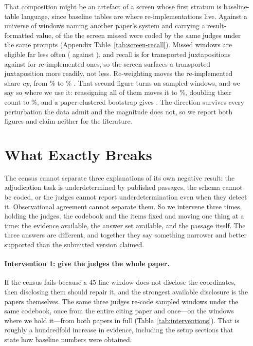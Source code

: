 \documentclass[11pt]{article}
\begin{document}
That composition might be an artefact of a screen whose first stratum is
baseline-table language, since baseline tables are where re-implementations
live. Against a universe of \RecUniverse{} windows naming another paper's system
and carrying a result-formatted value, \RecSampled{} of the \RecMissed{} the
screen missed were coded by the same judges under the same prompts (Appendix
Table~\ref{tab:screen-recall}). Missed windows are eligible far less often
(\RecEligMissed{} against \RecEligFrame{}), and recall is \RecTrans{}
\RecTransCI{} for transported juxtapositions against \RecReimpl{}
\RecReimplCI{} for re-implemented ones, so the screen surfaces a transported
juxtaposition more readily, not less. Re-weighting moves the re-implemented
share \emph{up}, from \RecFrameShare\% to \RecUniverseShare\%
\RecUniverseShareCI{}. That second figure turns on \RecTransEligN{} sampled
windows, and we say so where we use it: reassigning all of them moves it to
\RecPerturbAll\%, doubling their count to \RecPerturbDouble\%, and a
paper-clustered bootstrap gives \RecPaperCI{}. The direction survives every
perturbation the data admit and the magnitude does not, so we report both
figures and claim neither for the literature.

\section{What Exactly Breaks}
\label{sec:instrument}
\label{sec:tested}

The census cannot separate three explanations of its own negative result: the
adjudication task is underdetermined by published passages, the schema cannot be
coded, or the judges cannot report underdetermination even when they detect it.
Observational agreement cannot separate them. So we intervene three times,
holding the judges, the codebook and the items fixed and moving one thing at a
time: the evidence available, the answer set available, and the passage itself.
The three answers are different, and together they say something narrower and
better supported than the submitted version claimed.

\paragraph{Intervention 1: give the judges the whole paper.}
If the census fails because a \mbox{45-line} window does not disclose the
coordinates, then disclosing them should repair it, and the strongest available
disclosure is the papers themselves. The same three judges re-code \PrivN{}
sampled windows under the same codebook, once from the entire citing paper and
once---on the \PrivBoth{} windows where we hold it---from both papers in full
(Table~\ref{tab:interventions}). That is roughly a hundredfold increase in
evidence, including the setup sections that state how baseline numbers were
obtained.
\end{document}
